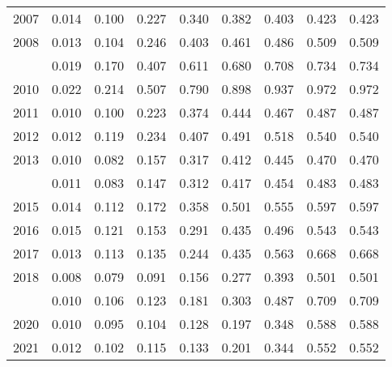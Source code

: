 \documentclass[
]{article}
\begin{document}
\begin{longtable}[t]{lrrrrrrrr}
2007 & 0.014 & 0.100 & 0.227 & 0.340 & 0.382 & 0.403 & 0.423 & 0.423\\
2008 & 0.013 & 0.104 & 0.246 & 0.403 & 0.461 & 0.486 & 0.509 & 0.509\\
\addlinespace
2009 & 0.019 & 0.170 & 0.407 & 0.611 & 0.680 & 0.708 & 0.734 & 0.734\\
2010 & 0.022 & 0.214 & 0.507 & 0.790 & 0.898 & 0.937 & 0.972 & 0.972\\
2011 & 0.010 & 0.100 & 0.223 & 0.374 & 0.444 & 0.467 & 0.487 & 0.487\\
2012 & 0.012 & 0.119 & 0.234 & 0.407 & 0.491 & 0.518 & 0.540 & 0.540\\
2013 & 0.010 & 0.082 & 0.157 & 0.317 & 0.412 & 0.445 & 0.470 & 0.470\\
\addlinespace
2014 & 0.011 & 0.083 & 0.147 & 0.312 & 0.417 & 0.454 & 0.483 & 0.483\\
2015 & 0.014 & 0.112 & 0.172 & 0.358 & 0.501 & 0.555 & 0.597 & 0.597\\
2016 & 0.015 & 0.121 & 0.153 & 0.291 & 0.435 & 0.496 & 0.543 & 0.543\\
2017 & 0.013 & 0.113 & 0.135 & 0.244 & 0.435 & 0.563 & 0.668 & 0.668\\
2018 & 0.008 & 0.079 & 0.091 & 0.156 & 0.277 & 0.393 & 0.501 & 0.501\\
\addlinespace
2019 & 0.010 & 0.106 & 0.123 & 0.181 & 0.303 & 0.487 & 0.709 & 0.709\\
2020 & 0.010 & 0.095 & 0.104 & 0.128 & 0.197 & 0.348 & 0.588 & 0.588\\
2021 & 0.012 & 0.102 & 0.115 & 0.133 & 0.201 & 0.344 & 0.552 & 0.552\\*
\end{longtable}
\end{document}
